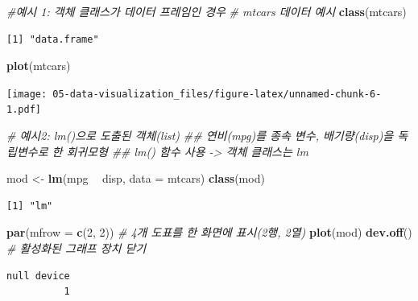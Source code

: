 \documentclass[
  11pt,
]{krantz}
\newenvironment{Shaded}{\begin{snugshade}}{\end{snugshade}}
\newcommand{\CommentTok}[1]{\textcolor[rgb]{0.37,0.37,0.37}{\textit{#1}}}
\newcommand{\DataTypeTok}[1]{\textcolor[rgb]{0.27,0.27,0.27}{#1}}
\newcommand{\DecValTok}[1]{\textcolor[rgb]{0.06,0.06,0.06}{#1}}
\newcommand{\KeywordTok}[1]{\textcolor[rgb]{0.27,0.27,0.27}{\textbf{#1}}}
\newcommand{\NormalTok}[1]{#1}
\newcommand{\OperatorTok}[1]{\textcolor[rgb]{0.43,0.43,0.43}{\textbf{#1}}}
\newcommand{\StringTok}[1]{\textcolor[rgb]{0.5,0.5,0.5}{#1}}
\begin{document}
\begin{Shaded}
\begin{Highlighting}[]
\CommentTok{#예시 1: 객체 클래스가 데이터 프레임인 경우}
\CommentTok{# mtcars 데이터 예시}
\KeywordTok{class}\NormalTok{(mtcars)}
\end{Highlighting}
\end{Shaded}

\begin{verbatim}
[1] "data.frame"
\end{verbatim}

\begin{Shaded}
\begin{Highlighting}[]
\KeywordTok{plot}\NormalTok{(mtcars)}
\end{Highlighting}
\end{Shaded}

\texttt{[image: 05-data-visualization\_files/figure-latex/unnamed-chunk-6-1.pdf]}

\normalsize

\footnotesize

\begin{Shaded}
\begin{Highlighting}[]
\CommentTok{# 예시2: lm()으로 도출된 객체(list)}
\CommentTok{## 연비(mpg)를 종속 변수, 배기량(disp)을 독립변수로 한 회귀모형}
\CommentTok{## lm() 함수 사용 -> 객체 클래스는 lm}

\NormalTok{mod <-}\StringTok{ }\KeywordTok{lm}\NormalTok{(mpg }\OperatorTok{~}\StringTok{ }\NormalTok{disp, }\DataTypeTok{data =}\NormalTok{ mtcars)}
\KeywordTok{class}\NormalTok{(mod)}
\end{Highlighting}
\end{Shaded}

\begin{verbatim}
[1] "lm"
\end{verbatim}

\begin{Shaded}
\begin{Highlighting}[]
\KeywordTok{par}\NormalTok{(}\DataTypeTok{mfrow =} \KeywordTok{c}\NormalTok{(}\DecValTok{2}\NormalTok{, }\DecValTok{2}\NormalTok{)) }\CommentTok{# 4개 도표를 한 화면에 표시(2행, 2열)}
\KeywordTok{plot}\NormalTok{(mod)}
\KeywordTok{dev.off}\NormalTok{() }\CommentTok{# 활성화된 그래프 장치 닫기}
\end{Highlighting}
\end{Shaded}

\begin{verbatim}
null device 
          1 
\end{verbatim}
\end{document}
